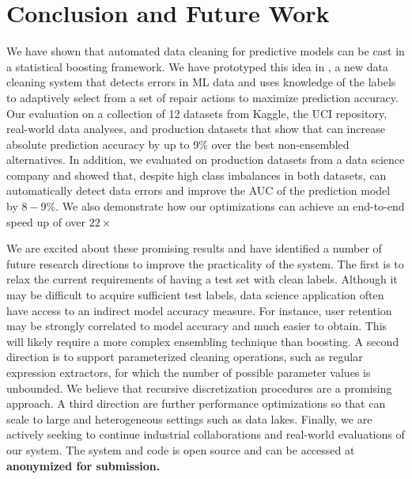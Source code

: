 \section{Conclusion and Future Work}
We have shown that automated data cleaning for predictive models can be cast in a statistical boosting framework.  We have prototyped this idea in \sys, a new data cleaning system that detects errors in ML data and uses knowledge of the labels to adaptively select from a set of repair actions to maximize prediction accuracy.
Our evaluation on a collection of 12 datasets from Kaggle, the UCI repository, real-world data analyses, and production datasets that show that \sys can increase absolute prediction accuracy by up to 9\% over the best non-ensembled alternatives. In addition, we evaluated \sys on production datasets from a data science company and showed that, despite high class imbalances in both datasets, \sys can automatically detect data errors and improve the AUC of the prediction model by $8-9\%$.  We also demonstrate how our optimizations can achieve an end-to-end speed up of over $22\times$


We are excited about these promising results and have identified a number of future research directions to improve the practicality of the system.  The first is to relax the current requirements of having a test set with clean labels.   Although it may be difficult to acquire sufficient test labels, data science application often have access to an indirect model accuracy measure.  For instance, user retention may be strongly correlated to model accuracy and much easier to obtain.  This will likely require a more complex ensembling technique than boosting.  A second direction is to support parameterized cleaning operations, such as regular expression extractors, for which the number of possible parameter values is unbounded.  We believe that recursive discretization procedures are a promising approach.  A third direction are further performance optimizations so that \sys can scale to large and heterogeneous settings such as data lakes.  Finally, we are actively seeking to continue industrial collaborations and real-world evaluations of our system.  The system and code is open source and can be accessed at {\bf anonymized for submission.}
